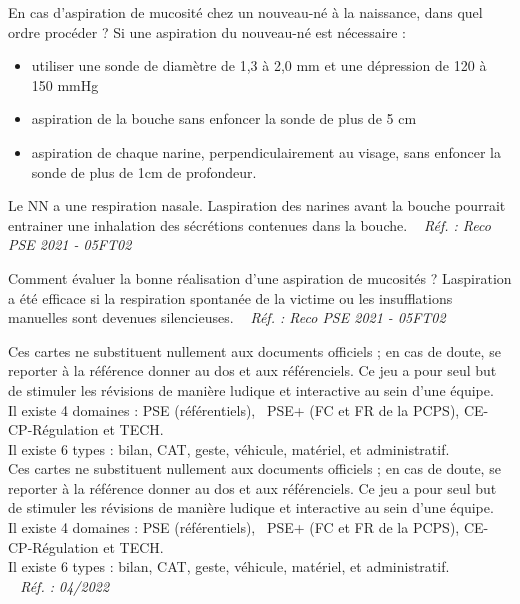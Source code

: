 \documentclass[grid,avery5371,landscape]{flashcards}
\makeatletter
\newcounter{nocarte}
\newcommand{\categ}[1]{%
  \def\@categ{#1}%
  \setcounter{nocarte}{0}%
}
\newcommand{\source}[1]{%
  \medskip
  \itshape%
   ~ \hfill Réf. : #1}
\makeatother
\begin{document}
\color[HTML]{003273}
\categ{PSE}
\begin{flashcard}[CAT]{
 En cas d'aspiration de mucosité chez un nouveau-né à la naissance, dans quel ordre procéder ?   }
  Si une aspiration du nouveau-né est nécessaire :
\begin{itemize} \item utiliser une sonde de diamètre de 1,3 à 2,0 mm et une dépression de 120 à 150 mmHg
 \item aspiration de la bouche sans enfoncer la sonde de plus de 5 cm
 \item aspiration de chaque narine, perpendiculairement au visage, sans enfoncer la sonde de plus de 1cm de profondeur.
\end{itemize}
Le NN a une respiration nasale. Laspiration des narines avant la bouche pourrait entrainer une inhalation des sécrétions contenues dans la bouche.
  \source{Reco PSE 2021 - 05FT02}
\end{flashcard}


\color[HTML]{003273}
\categ{PSE}
\begin{flashcard}[bilan]{
 Comment évaluer la bonne réalisation d'une aspiration de mucosités ?   }
  Laspiration a été efficace si la respiration spontanée de la victime ou les insufflations manuelles sont devenues silencieuses.
  \source{Reco PSE 2021 - 05FT02}
\end{flashcard}


\color[HTML]{003273}
\categ{PSE}
\begin{flashcard}[info]{
 Ces cartes ne substituent nullement aux documents officiels ; en cas de doute, se reporter à la référence donner au dos et aux référenciels. Ce jeu a pour seul but de stimuler les révisions de manière ludique et interactive au sein d'une équipe. \\ Il existe 4 domaines : PSE (référentiels),  PSE+ (FC et FR de la PCPS), CE-CP-Régulation et TECH. \\ 
Il existe 6 types : bilan, CAT, geste, véhicule, matériel, et administratif. \\   }
  Ces cartes ne substituent nullement aux documents officiels ; en cas de doute, se reporter à la référence donner au dos et aux référenciels. Ce jeu a pour seul but de stimuler les révisions de manière ludique et interactive au sein d'une équipe. \\ Il existe 4 domaines : PSE (référentiels),  PSE+ (FC et FR de la PCPS), CE-CP-Régulation et TECH. \\ 
Il existe 6 types : bilan, CAT, geste, véhicule, matériel, et administratif. \\
  \source{04/2022}
\end{flashcard}
\end{document}
